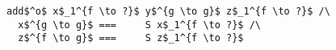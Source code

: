 \begin{figure}[!t]
  \centering
  \begin{minipage}{\columnwidth}
    \begin{lstlisting}[frame=tb]
  add$^o$ x$_1^{f \to ?}$ y$^{g \to g}$ z$_1^{f \to ?}$ /\
  x$^{g \to g}$ ===     S x$_1^{f \to ?}$ /\
  z$^{f \to g}$ ===     S z$_1^{f \to ?}$
    \end{lstlisting}
  \end{minipage}
\end{figure}